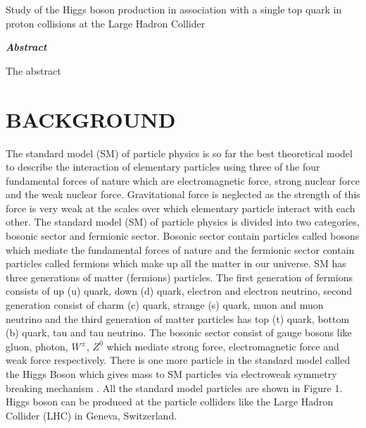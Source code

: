 \documentclass[final,3p]{CSP}
\def\ProjectTitle{Study of the Higgs boson production in association with a single top quark in proton collisions at the Large Hadron Collider}
\begin{document}
\begin{adjustwidth}{1cm}{1cm}

  \begin{center}
    {\Large \ProjectTitle \par}
    \vspace{1cm}
    {\itshape\textbf{Abstract}\par}
  \end{center}

  The abstract \par

\end{adjustwidth}

\hspace{0pt}
\vfill



\newpage
\section{BACKGROUND}


The standard model (SM) of particle physics is so far the best theoretical model to describe the interaction of elementary 
particles using three of the four fundamental forces of nature which are electromagnetic force, strong nuclear force and the 
weak nuclear force. Gravitational force is neglected as the strength of this force is very weak at the scales over which 
elementary particle interact with each other. The standard model (SM) of particle physics is divided into two categories, 
bosonic sector and fermionic sector. Bosonic sector contain particles called bosons which mediate the fundamental forces of 
nature and the fermionic sector contain particles called fermions which make up all the matter in our universe. SM has three 
generations of matter (fermions) particles. The first generation of fermions consists of up (u) quark, down (d) quark, electron 
and electron neutrino, second generation consist of charm (c) quark, strange (s) quark, muon and muon neutrino and the third 
generation of matter particles has top (t) quark, bottom (b) quark, tau and tau neutrino. The bosonic sector consist of gauge 
bosons like gluon, photon, $W^{\pm}$, $Z^0$ which mediate strong force, electromagnetic force and weak force respectively. There is one more particle in the standard model called the Higgs Boson which gives mass to SM particles via electroweak symmetry breaking mechanism \cite{Chatrchyan:2012xdj}. All the standard model particles are shown in Figure 1. Higgs boson can be produced at the particle colliders like the Large Hadron Collider (LHC) in Geneva, Switzerland.
\end{document}
